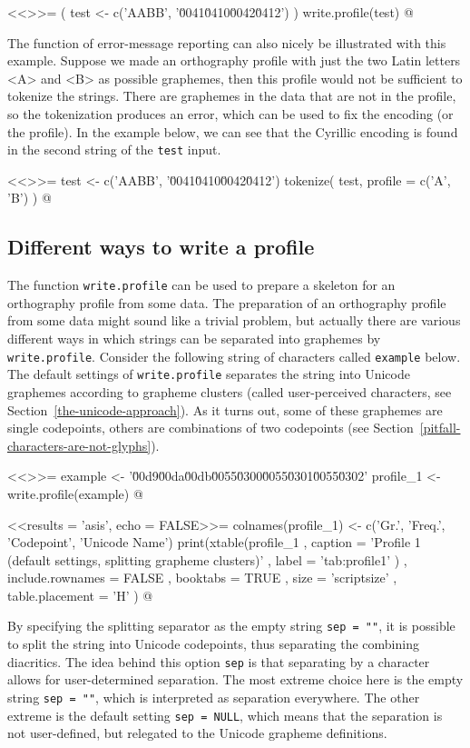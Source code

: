 <<>>=
( test <- c('AABB', '\u0041\u0410\u0042\u0412') )
write.profile(test)
@

The function of error-message reporting can also nicely be illustrated
with this example. Suppose we made an orthography profile with just the two
Latin letters <A> and <B> as possible graphemes, then this profile would not be
sufficient to tokenize the strings. There are graphemes in the data that are not
in the profile, so the tokenization produces an error, which can be used to fix
the encoding (or the profile). In the example below, we can see that the
Cyrillic encoding is found in the second string of the \texttt{test} input.

<<>>=
test <- c('AABB', '\u0041\u0410\u0042\u0412')
tokenize( test, profile = c('A', 'B') )
@

\subsection*{Different ways to write a profile}
\label{write-profile}

The function \texttt{write.profile} can be used to prepare a skeleton for an
orthography profile from some data. The preparation of an orthography profile
from some data might sound like a trivial problem, but actually there are
various different ways in which strings can be separated into graphemes by
\texttt{write.profile}. Consider the following string of characters called
\texttt{example} below. The default settings of \texttt{write.profile} separates
the string into Unicode graphemes according to grapheme clusters
(called user-perceived characters, see Section~\ref{the-unicode-approach}). As it 
turns out, some of these graphemes are single codepoints, others are combinations
of two codepoints (see Section~\ref{pitfall-characters-are-not-glyphs}).

<<>>=
example <- '\u00d9\u00da\u00db\u0055\u0300\u0055\u0301\u0055\u0302'
profile_1 <- write.profile(example)
@

<<results = 'asis', echo = FALSE>>=
colnames(profile_1) <- c('Gr.', 'Freq.', 'Codepoint', 'Unicode Name')
print(xtable(profile_1
        , caption = 'Profile 1 (default settings, splitting grapheme clusters)'
        , label = 'tab:profile1'
        )
  , include.rownames = FALSE
  , booktabs = TRUE
  , size = 'scriptsize'
  , table.placement = 'H'
  )
@

By specifying the splitting separator as the empty string
\texttt{sep~=~""}, it is possible to split the string into Unicode codepoints,
thus separating the combining diacritics. The idea behind this option
\texttt{sep} is that separating by a character allows for user-determined
separation. The most extreme choice here is the empty string \texttt{sep~=~""},
which is interpreted as separation everywhere. The other extreme is the default
setting \texttt{sep~=~NULL}, which means that the separation is not
user-defined, but relegated to the Unicode grapheme definitions.

